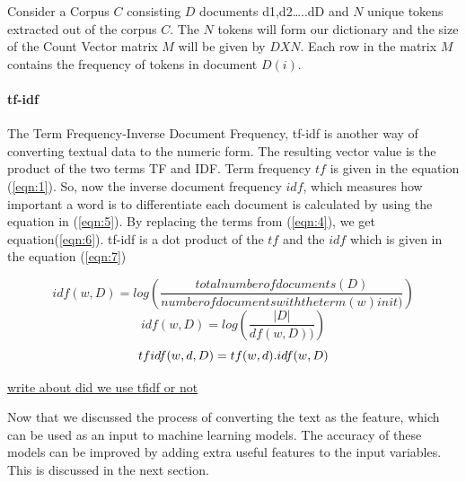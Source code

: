 Consider a Corpus $C$ consisting $D$ documents {d1,d2…..dD} and $N$ unique tokens extracted out of the corpus $C$. The $N$ tokens will form our dictionary and the size of the Count Vector matrix $M$ will be given by $D X N$. Each row in the matrix $M$ contains the frequency of tokens in document $D(i)$.

\paragraph{tf-idf}
The Term Frequency-Inverse Document Frequency, tf-idf is another way of converting textual data to the numeric form. The resulting vector value is the product of the two terms TF and IDF. Term frequency $tf$ is given in the equation (\ref{eqn:1}). So, now the inverse document frequency $idf$, which measures how important a word is to differentiate each document is calculated by using the equation in (\ref{eqn:5}). By replacing the terms from (\ref{eqn:4}), we get equation(\ref{eqn:6}). tf-idf is a dot product of the $tf$ and the $idf$ which is given in the equation (\ref{eqn:7})

\begin{equation}
\label{eqn:5}
idf(w,D) = log (\frac{total number of documents(D)}{number of documents with the term(w) in it)})
\end{equation}
\begin{equation}
\label{eqn:6}
idf(w,D) = log (\frac{|D|}{df(w,D))})
\end{equation}
\begin{equation}
\label{eqn:7}
tf\-idf(w,d,D) = tf(w,d) . idf(w,D)
\end{equation}


\underline{write about  did we use tfidf or not}

Now that we discussed the process of converting the text as the feature, which can be used as an input to machine learning models. The accuracy of these models can be improved by adding extra useful features to the input variables. This is discussed in the next section.


